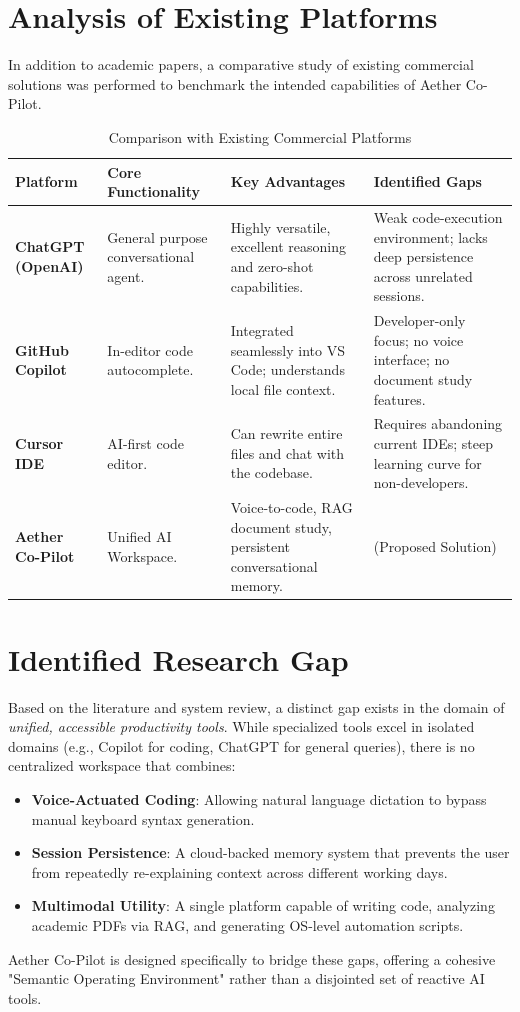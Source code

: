 \section{Analysis of Existing Platforms}

In addition to academic papers, a comparative study of existing commercial solutions was performed to benchmark the intended capabilities of Aether Co-Pilot.

\begin{table}[ht!]
\centering
\renewcommand{\arraystretch}{1.5}
\begin{tabular}{|p{3cm}|p{4.5cm}|p{4.5cm}|p{4cm}|}
\hline
\textbf{Platform} & \textbf{Core Functionality} & \textbf{Key Advantages} & \textbf{Identified Gaps} \\ \hline
\textbf{ChatGPT (OpenAI)} & General purpose conversational agent. & Highly versatile, excellent reasoning and zero-shot capabilities. & Weak code-execution environment; lacks deep persistence across unrelated sessions. \\ \hline
\textbf{GitHub Copilot} & In-editor code autocomplete. & Integrated seamlessly into VS Code; understands local file context. & Developer-only focus; no voice interface; no document study features. \\ \hline
\textbf{Cursor IDE} & AI-first code editor. & Can rewrite entire files and chat with the codebase. & Requires abandoning current IDEs; steep learning curve for non-developers. \\ \hline
\textbf{Aether Co-Pilot} & Unified AI Workspace. & Voice-to-code, RAG document study, persistent conversational memory. & (Proposed Solution) \\ \hline
\end{tabular}
\caption{Comparison with Existing Commercial Platforms}
\label{tab:commercial_comparison}
\end{table}

\section{Identified Research Gap}
Based on the literature and system review, a distinct gap exists in the domain of \textit{unified, accessible productivity tools}. While specialized tools excel in isolated domains (e.g., Copilot for coding, ChatGPT for general queries), there is no centralized workspace that combines:
\begin{itemize}
    \item \textbf{Voice-Actuated Coding}: Allowing natural language dictation to bypass manual keyboard syntax generation.
    \item \textbf{Session Persistence}: A cloud-backed memory system that prevents the user from repeatedly re-explaining context across different working days.
    \item \textbf{Multimodal Utility}: A single platform capable of writing code, analyzing academic PDFs via RAG, and generating OS-level automation scripts.
\end{itemize}
Aether Co-Pilot is designed specifically to bridge these gaps, offering a cohesive "Semantic Operating Environment" rather than a disjointed set of reactive AI tools.

\newpage

